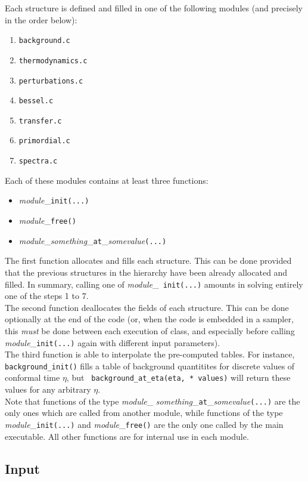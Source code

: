 \documentclass{article}
\begin{document}
Each structure is defined and filled in one of the following modules
(and precisely in the order below):
\begin{enumerate}
\item {\tt  background.c }
\item {\tt  thermodynamics.c   }
\item {\tt  perturbations.c    }
\item {\tt  bessel.c  } 
\item {\tt  transfer.c }
\item {\tt  primordial.c }
\item {\tt  spectra.c     }
\end{enumerate}
Each of these modules contains at least three functions:
\begin{itemize}
\item {\it module}\_{\tt init(...)}
\item {\it module}\_{\tt free()}
\item {\it module}\_{\it something}\_{\tt at}\_{\it somevalue}{\tt(...)}
\end{itemize}
The first function allocates and fills each structure. This can be
done provided that the previous structures in the hierarchy have been
already allocated and filled. In summary, calling one of {\it module}\_{\tt
init(...)} amounts in solving entirely one of the steps 1 to 7.\\ 
The second function deallocates the fields of each structure. This
can be done optionally at the end of the code (or, when the code is embedded
in a sampler, this {\it must} be done 
between each execution of {\sc class}, and especially before calling {\it
module}\_{\tt init(...)} again with different input parameters).\\ The
third function is able to interpolate the pre-computed tables. For
instance, {\tt background\_init()} fills a table of background
quantitites for discrete values of conformal time $\eta$, but {\tt
background\_at\_eta(eta, * values)} will return these values for any
arbitrary $\eta$. \\ Note that functions of the type {\it module}\_{\it
something}\_{\tt at}\_{\it somevalue}{\tt(...)} are the only ones which are
called from another module, while functions of the type {\it
module}\_{\tt init(...)} and {\it module}\_{\tt free()} are the only
one called by the main executable.  All other functions are for
internal use in each module.\\

\subsection{Input}
\end{document}
